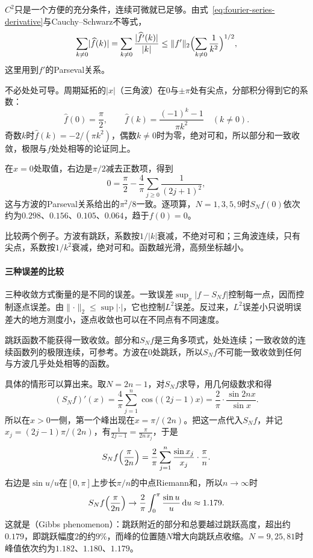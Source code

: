 $C^2$只是一个方便的充分条件，连续可微就已足够。由式~\eqref{eq:fourier-series-derivative}与Cauchy--Schwarz不等式，
\[
\sum_{k\neq0}\lvert\widehat f(k)\rvert=\sum_{k\neq0}\frac{\lvert\widehat{f'}(k)\rvert}{\lvert k\rvert}
\leq\lVert f'\rVert_2\Bigl(\sum_{k\neq0}\frac1{k^2}\Bigr)^{1/2},
\]
这里用到$f'$的Parseval关系。

不必处处可导。周期延拓的$\lvert x\rvert$（三角波）在$0$与$\pm\pi$处有尖点，分部积分得到它的系数：
\[
\widehat f(0)=\frac\pi2,\qquad
\widehat f(k)=\frac{(-1)^k-1}{\pi k^2}\quad(k\neq0).
\]
奇数$k$时$\widehat f(k)=-2/(\pi k^2)$，偶数$k\neq0$时为零，绝对可和，所以部分和一致收敛，极限与$f$处处相等的论证同上。

在$x=0$处取值，右边是$\pi/2$减去正数项，得到
\[
0=\frac\pi2-\frac4\pi\sum_{j\geq0}\frac1{(2j+1)^2},
\]
这与方波的Parseval关系给出的$\pi^2/8$一致。逐项算，$N=1,3,5,9$时$S_Nf(0)$依次约为$0.298$、$0.156$、$0.105$、$0.064$，趋于$f(0)=0$。

比较两个例子。方波有跳跃，系数按$1/\lvert k\rvert$衰减，不绝对可和；三角波连续，只有尖点，系数按$1/k^2$衰减，绝对可和。函数越光滑，高频坐标越小。

\paragraph{三种误差的比较}

三种收敛方式衡量的是不同的误差。一致误差$\sup_x\lvert f-S_Nf\rvert$控制每一点，因而控制逐点误差。由$\lVert\cdot\rVert_2\leq\sup\lvert\cdot\rvert$，它也控制$L^2$误差。反过来，$L^2$误差小只说明误差大的地方测度小，逐点收敛也可以在不同点有不同速度。

跳跃函数不能获得一致收敛。部分和$S_Nf$是三角多项式，处处连续；一致收敛的连续函数列的极限连续，可参考。方波在$0$处跳跃，所以$S_Nf$不可能一致收敛到任何与方波几乎处处相等的函数。

具体的情形可以算出来。取$N=2n-1$，对$S_Nf$求导，用几何级数求和得
\[
(S_Nf)'(x)=\frac4\pi\sum_{j=1}^n\cos\bigl((2j-1)x\bigr)=\frac2\pi\cdot\frac{\sin 2nx}{\sin x}.
\]
所以在$x>0$一侧，第一个峰出现在$x=\pi/(2n)$。把这一点代入$S_Nf$，并记$x_j=(2j-1)\pi/(2n)$，有$\frac1{2j-1}=\frac{\pi}{2n\,x_j}$，于是
\[
S_Nf\Bigl(\frac\pi{2n}\Bigr)=\frac2\pi\sum_{j=1}^n\frac{\sin x_j}{x_j}\cdot\frac\pi n.
\]
右边是$\sin u/u$在$[0,\pi]$上步长$\pi/n$的中点Riemann和，所以$n\to\infty$时
\[
S_Nf\Bigl(\frac\pi{2n}\Bigr)\to\frac2\pi\int_0^\pi\frac{\sin u}{u}\,\mathrm du\approx1.179.
\]
这就是（Gibbs phenomenon）：跳跃附近的部分和总要越过跳跃高度，超出约$0.179$，即跳跃幅度$2$的约$9\%$，而峰的位置随$N$增大向跳跃点收缩。$N=9,25,81$时峰值依次约为$1.182$、$1.180$、$1.179$。

